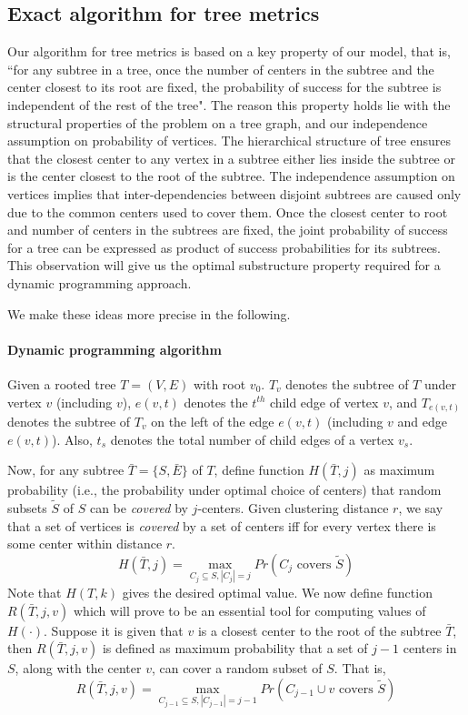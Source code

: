 \documentclass[11pt,onecolumn]{article}
\begin{document}
\subsection{Exact algorithm for tree metrics}
Our algorithm for tree metrics is based on a key property of our model, that is, ``for any subtree in a tree, once the number of centers in the subtree and the center closest to its root are fixed, the probability of success for the subtree is independent of the rest of the tree". The reason this property holds lie with the structural properties of the problem on a tree graph, and our independence assumption on probability of vertices. The hierarchical structure of tree ensures that the closest center to any vertex in a subtree either lies inside the subtree or is the center closest to the root of the subtree. 
The independence assumption on vertices implies that inter-dependencies between disjoint subtrees are caused only due to the common centers used to cover them. Once the closest center to root and number of centers in the subtrees are fixed, the joint probability of success for a tree can be expressed as product of success probabilities for its subtrees.  This observation will give us the optimal substructure property required for a dynamic programming approach.

We make these ideas more precise in the following.
 
\paragraph{Dynamic programming algorithm}
Given a rooted tree $T=(V, E)$ with root $v_0$. $T_{v}$ denotes the subtree of $T$ under vertex $v$ (including $v$), $e(v,t)$ denotes the $t^{th}$ child edge of vertex $v$, and $T_{e(v,t)}$ denotes the subtree of $T_v$ on the left of the edge $e(v,t)$ (including $v$ and edge $e(v,t)$). 
Also, $t_s$ denotes the total number of child edges of a vertex $v_s$.



Now, for any subtree $\bar{T}=\{S,\bar{E}\}$ of $T$, define function $H(\bar{T}, j)$ as maximum probability (i.e., the probability under optimal choice of centers) that random subsets $\tilde{S}$ of $S$ can be {\it covered} by $j$-centers. Given clustering distance $r$, we say that a set of vertices is {\it covered} by a set of centers iff for every vertex there is some center within distance $r$.
$$ H(\bar{T},j) = \max_{C_j \subseteq S, |C_j|=j } Pr(C_j \mbox{ covers } \tilde{S})$$
Note that $H(T,k)$ gives the desired optimal value. We now define function $R(\bar{T}, j, v)$ which will prove to be an essential tool for computing values of $H(\cdot)$. Suppose it is given that $v$ is a closest center to the root of the subtree $\bar{T}$, then $R(\bar{T}, j, v)$ is defined as maximum probability that a set of $j-1$ centers in $S$, along with the center $v$, can cover a random subset of $S$. That is,
$$R(\bar{T}, j, v) = \max_{C_{j-1}\subseteq S, |C_{j-1}|=j-1
}Pr(C_{j-1} \cup v \mbox{ covers } \tilde{S})$$
\end{document}
